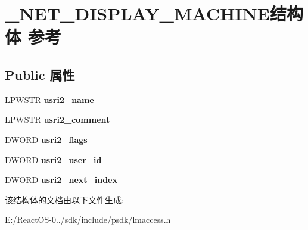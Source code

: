 \hypertarget{struct___n_e_t___d_i_s_p_l_a_y___m_a_c_h_i_n_e}{}\section{\+\_\+\+N\+E\+T\+\_\+\+D\+I\+S\+P\+L\+A\+Y\+\_\+\+M\+A\+C\+H\+I\+N\+E结构体 参考}
\label{struct___n_e_t___d_i_s_p_l_a_y___m_a_c_h_i_n_e}
\subsection*{Public 属性}
\begin{DoxyCompactItemize}
\item 
\mbox{\label{struct___n_e_t___d_i_s_p_l_a_y___m_a_c_h_i_n_e_abe8ba10707a18a2fcea1da8c8ce040fa}} 
L\+P\+W\+S\+TR {\bfseries usri2\+\_\+name}
\item 
\mbox{\label{struct___n_e_t___d_i_s_p_l_a_y___m_a_c_h_i_n_e_ad9fef65f6a9d498f48a02dce4832d51d}} 
L\+P\+W\+S\+TR {\bfseries usri2\+\_\+comment}
\item 
\mbox{\label{struct___n_e_t___d_i_s_p_l_a_y___m_a_c_h_i_n_e_a1f25c0efff071429b7380dd8091cfa08}} 
D\+W\+O\+RD {\bfseries usri2\+\_\+flags}
\item 
\mbox{\label{struct___n_e_t___d_i_s_p_l_a_y___m_a_c_h_i_n_e_ab808b978990b888058a00723a5c89ef9}} 
D\+W\+O\+RD {\bfseries usri2\+\_\+user\+\_\+id}
\item 
\mbox{\label{struct___n_e_t___d_i_s_p_l_a_y___m_a_c_h_i_n_e_a3d8b814bc7c17236e073fb4a2977d73e}} 
D\+W\+O\+RD {\bfseries usri2\+\_\+next\+\_\+index}
\end{DoxyCompactItemize}


该结构体的文档由以下文件生成\+:\begin{DoxyCompactItemize}
\item 
E\+:/\+React\+O\+S-\/0../sdk/include/psdk/lmaccess.\+h\end{DoxyCompactItemize}
